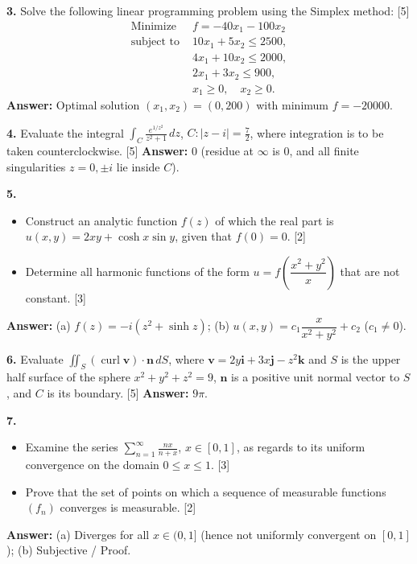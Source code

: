 \documentclass[11pt,a4paper]{article}
\newcommand{\ans}[1]{\textbf{Answer:} #1\par\medskip}
\begin{document}
\textbf{3.} Solve the following linear programming problem using the Simplex method: \hfill [5]
\begin{align*}
  \text{Minimize } & f = -40x_1 - 100x_2 \\
  \text{subject to } & 10x_1 + 5x_2 \le 2500, \\
                     & 4x_1 + 10x_2 \le 2000, \\
                     & 2x_1 + 3x_2 \le 900, \\
                     & x_1 \ge 0, \quad x_2 \ge 0.
\end{align*}
\ans{Optimal solution $(x_1, x_2) = (0, 200)$ with minimum $f = -20000$.}

\textbf{4.} Evaluate the integral $\displaystyle\int_C \frac{e^{1/z^2}}{z^2 + 1}\,dz$, $C : |z - i| = \frac{7}{2}$, where integration is to be taken counterclockwise. \hfill [5]
\ans{$0$ (residue at $\infty$ is $0$, and all finite singularities $z = 0, \pm i$ lie inside $C$).}

\textbf{5.}
\begin{itemize}
  \setlength{\itemsep}{3pt}\setlength{\parskip}{0pt}
  \item[(a)] Construct an analytic function $f(z)$ of which the real part is $u(x,y) = 2xy + \cosh x \sin y$, given that $f(0) = 0$. \hfill [2]
  \item[(b)] Determine all harmonic functions of the form $u = f\!\left(\dfrac{x^2 + y^2}{x}\right)$ that are not constant. \hfill [3]
\end{itemize}
\ans{(a) $f(z) = -i(z^2 + \sinh z)$; \quad (b) $u(x,y) = c_1 \dfrac{x}{x^2 + y^2} + c_2$ ($c_1 \ne 0$).}

\textbf{6.} Evaluate $\displaystyle\iint_S (\operatorname{curl}\mathbf{v}) \cdot \mathbf{n}\,dS$, where $\mathbf{v} = 2y\mathbf{i} + 3x\mathbf{j} - z^2\mathbf{k}$ and $S$ is the upper half surface of the sphere $x^2 + y^2 + z^2 = 9$, $\mathbf{n}$ is a positive unit normal vector to $S$, and $C$ is its boundary. \hfill [5]
\ans{$9\pi$.}

\textbf{7.}
\begin{itemize}
  \setlength{\itemsep}{3pt}\setlength{\parskip}{0pt}
  \item[(a)] Examine the series $\displaystyle\sum_{n=1}^{\infty} \frac{nx}{n+x}$, $x \in [0,1]$, as regards to its uniform convergence on the domain $0 \le x \le 1$. \hfill [3]
  \item[(b)] Prove that the set of points on which a sequence of measurable functions $(f_n)$ converges is measurable. \hfill [2]
\end{itemize}
\ans{(a) Diverges for all $x \in (0,1]$ (hence not uniformly convergent on $[0,1]$); \quad (b) Subjective / Proof.}
\end{document}
